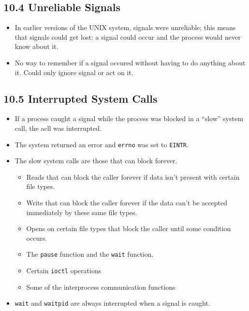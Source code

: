 \documentclass[]{article}
\newcommand{\code}{\texttt}
\begin{document}
\subsection*{10.4 Unreliable Signals}
\begin{itemize}
\item In earlier versions of the UNIX system, signals were unreliable; this
means that signals could get lost: a signal could occur and the process would
never know about it.
\item No way to remember if a signal occured without having to do anything about
it. Could only ignore signal or act on it.
\end{itemize}

\subsection*{10.5 Interrupted System Calls}
\begin{itemize}
\item If a process caught a signal while the process was blocked in a ``slow''
system call, the acll was interrupted.
\item The system returned an error and \code{errno} was set to \code{EINTR}.
\item The slow system calls are those that can block forever.
\begin{itemize}
\item Reads that can block the caller forever if data isn't present with certain
file types.
\item Write that can block the caller forever if the data can't be accepted
immediately by these same file types.
\item Opens on certain file types that block the caller until some condition
occurs.
\item The \code{pause} function and the \code{wait} function.
\item Certain \code{ioctl} operations
\item Some of the interprocess communication functions
\end{itemize}
\item \code{wait} and \code{waitpid} are always interrupted when a signal is
caught.
\end{itemize}
\end{document}
